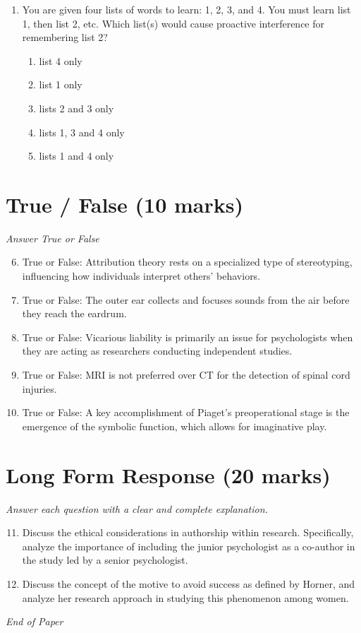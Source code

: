 \documentclass[12pt]{article}
\begin{document}
\begin{enumerate}[label=\arabic*.]
\begin{enumerate}[label=(\alph*)]
    \item Working memory
    \item Episodic memory
\end{enumerate}
\item You are given four lists of words to learn: 1, 2, 3, and 4. You must learn list 1, then list 2, etc. Which list(s) would cause proactive interference for remembering list 2?
\begin{enumerate}[label=(\alph*)]
    \item list 4 only
    \item list 1 only
    \item lists 2 and 3 only
    \item lists 1, 3 and 4 only
    \item lists 1 and 4 only
\end{enumerate}
\end{enumerate}

\section*{True / False (10 marks)}
\textit{Answer True or False}
\begin{enumerate}[label=\arabic*.]
\setcounter{enumi}{5}
\item True or False: Attribution theory rests on a specialized type of stereotyping, influencing how individuals interpret others' behaviors.
\item True or False: The outer ear collects and focuses sounds from the air before they reach the eardrum.
\item True or False: Vicarious liability is primarily an issue for psychologists when they are acting as researchers conducting independent studies.
\item True or False: MRI is not preferred over CT for the detection of spinal cord injuries.
\item True or False: A key accomplishment of Piaget's preoperational stage is the emergence of the symbolic function, which allows for imaginative play.
\end{enumerate}

\section*{Long Form Response (20 marks)}
\textit{Answer each question with a clear and complete explanation.}
\begin{enumerate}[label=\arabic*.]
\setcounter{enumi}{10}
\item Discuss the ethical considerations in authorship within research. Specifically, analyze the importance of including the junior psychologist as a co-author in the study led by a senior psychologist.
\item Discuss the concept of the motive to avoid success as defined by Horner, and analyze her research approach in studying this phenomenon among women.
\end{enumerate}

\vfill
\noindent\textit{End of Paper}
\end{document}
